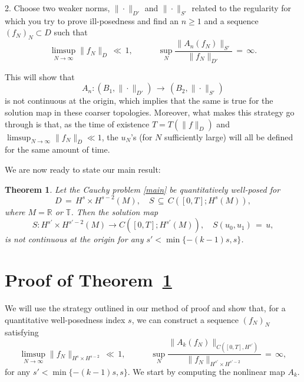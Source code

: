 \documentclass{amsart}
\newtheorem{theorem}{Theorem}[section]
\begin{document}
2. Choose two weaker norms, $\| \cdot\|_{D'}$ and $\| \cdot\|_{S'}$ related to the regularity for which you try to prove ill-posedness and find an $n\geq 1$ and a sequence $(f_N)_N\subset D$ such that
\begin{equation}
\limsup_{N\to \infty} \|f_N\|_D\,\ll\,1, \qquad \quad \sup_N \frac{\|A_n(f_N)\|_{S'}}{\|f_N\|_{D'}}\,=\,\infty.
\label{ip}
\end{equation}

This will show that 
\begin{equation}
A_n: (B_1,\|\cdot \|_{D'})\,\longrightarrow\,(B_2,\| \cdot\|_{S'})
\end{equation} 
is not continuous at the origin, which implies that the same is true for the solution map in these coarser  topologies. Moreover, what makes this strategy go through is that, as the time of existence $T=T(\|f\|_D)$ and $\limsup_{N\to \infty} \|f_N\|_D \ll 1$, the $u_N$'s (for $N$ sufficiently large) will all be defined for the same amount of time.


We are now ready to state our main result:

\begin{theorem}
Let the Cauchy problem \eqref{main} be quantitatively well-posed for
\[
D\,=\,H^s \times H^{s-2}(M), \quad S\,\subseteq \,C([0,T]; H^s(M)), \]
where  $M=\mathbb{R}$ or $\mathbb{T}$. Then the solution map
\begin{equation}
S: H^{s'} \times H^{s'-2}(M) \to C([0,T]; H^{s'}(M)), \quad
S(u_0,u_1)\,=\,u,
\label{solmap}
\end{equation}
is not continuous at the origin for any $s'< \min\{-(k-1)s, s\}$.
\label{mainth}
\end{theorem}

\section{Proof of Theorem~\ref{mainth}}
We will use the strategy outlined in our method of proof and show that, for a quantitative well-posedness  index $s$, we can construct a sequence $(f_N)_N$ satisfying
\[
\limsup_{N\to \infty} \|f_N\|_{H^s \times H^{s-2}}\,\ll\,1, \qquad \quad \sup_N \frac{\|A_{k}(f_N)\|_{C([0,T],H^{s'})}}{\|f_N\|_{H^{s'} \times H^{s'-2}}}\,=\,\infty,\]
for any $s'< \min\{-(k-1)s, s\}$. We start by computing the nonlinear map $A_{k}$.
\end{document}

